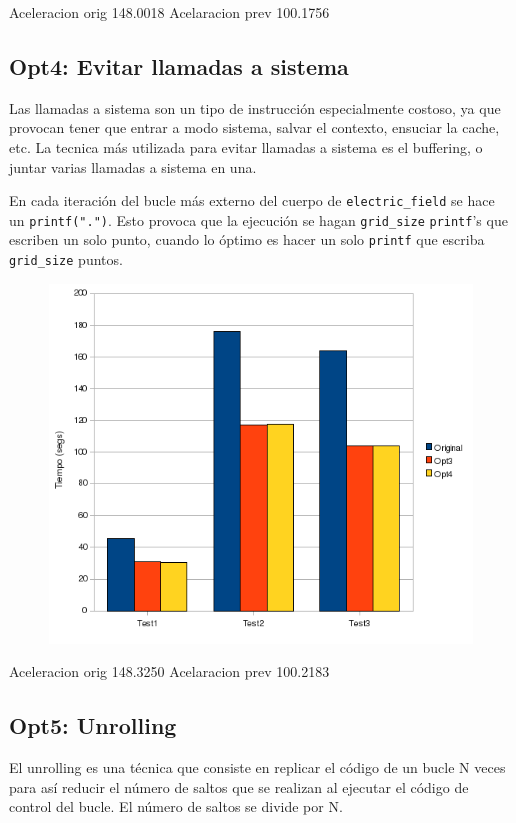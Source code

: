 Aceleracion orig	148.0018%
Acelaracion prev	100.1756%

\subsection{Opt4: Evitar llamadas a sistema}

Las llamadas a sistema son un tipo de instrucci\'{o}n especialmente costoso, ya
que provocan tener que entrar a modo sistema, salvar el contexto, ensuciar la
cache, etc. La tecnica m\'{a}s utilizada para evitar llamadas a sistema es el
buffering, o juntar varias llamadas a sistema en una.

En cada iteraci\'{o}n del bucle m\'{a}s externo del cuerpo de
\texttt{electric\_field} se hace un \texttt{printf(".")}. Esto provoca que
la ejecuci\'{o}n se hagan \texttt{grid\_size} \texttt{printf}'s que escriben un
solo punto, cuando lo \'{o}ptimo es hacer un solo \texttt{printf} que escriba
\texttt{grid\_size} puntos.

\begin{figure}[ht]
   \centering
   \includegraphics[keepaspectratio=true,width=.6\textwidth]{figures/opt4-perf}
\end{figure}

Aceleracion orig	148.3250%
Acelaracion prev	100.2183%

\subsection{Opt5: Unrolling}

El unrolling es una t\'{e}cnica que consiste en replicar el c\'{o}digo de un
bucle N veces para as\'{i} reducir el n\'{u}mero de saltos que se realizan al
ejecutar el c\'{o}digo de control del bucle. El n\'{u}mero de saltos se divide
por N.

